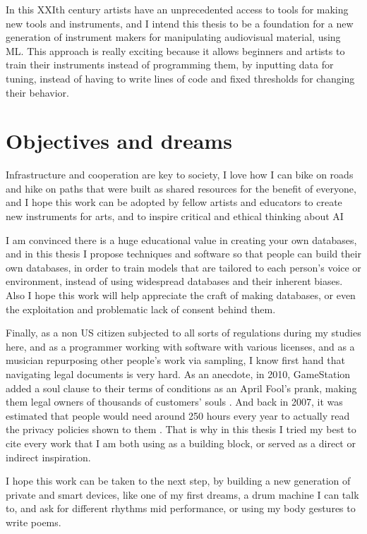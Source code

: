 In this XXIth century artists have an unprecedented access to tools for making new tools and instruments, and I intend this thesis to be a foundation for a new generation of instrument makers for manipulating audiovisual material, using \acrshort{ML}. This approach is really exciting because it allows beginners and artists to train their instruments instead of programming them, by inputting data for tuning, instead of having to write lines of code and fixed thresholds for changing their behavior.

\section{Objectives and dreams}

Infrastructure and cooperation are key to society, I love how I can bike on roads and hike on paths that were built as shared resources for the benefit of everyone, and I hope this work can be adopted by fellow artists and educators to create new instruments for arts, and to inspire critical and ethical thinking about \acrshort{AI}

I am convinced there is a huge educational value in creating your own databases, and in this thesis I propose techniques and software so that people can build their own databases, in order to train models that are tailored to each person's voice or environment, instead of using widespread databases and their inherent biases. Also I hope this work will help appreciate the craft of making databases, or even the exploitation and problematic lack of consent behind them.

Finally, as a non US citizen subjected to all sorts of regulations during my studies here, and as a programmer working with software with various licenses, and as a musician repurposing other people's work via sampling, I know first hand that navigating legal documents is very hard. As an anecdote, in 2010, GameStation added a soul clause to their terms of conditions as an April Fool's prank, making them legal owners of thousands of customers' souls \cite{website-huffpost-gamestation-soul-clause}. And back in 2007, it was estimated that people would need around 250 hours every year to actually read the privacy policies shown to them \cite{article-cost-of-reading-privacy-policies}. That is why in this thesis I tried my best to cite every work that I am both using as a building block, or served as a direct or indirect inspiration.

I hope this work can be taken to the next step, by building a new generation of private and smart devices, like one of my first dreams, a drum machine I can talk to, and ask for different rhythms mid performance, or using my body gestures to write poems.

